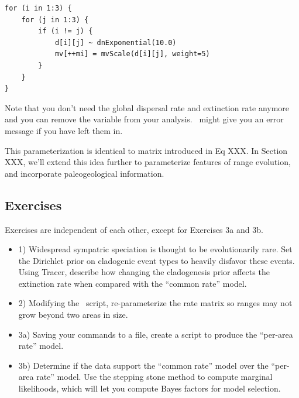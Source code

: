 \begin{snugshade}
\begin{lstlisting}
for (i in 1:3) {
    for (j in 1:3) {
        if (i != j) {
            d[i][j] ~ dnExponential(10.0)
            mv[++mi] = mvScale(d[i][j], weight=5)
        }
    }
}
\end{lstlisting}
\end{snugshade}
Note that you don't need the global dispersal rate  and extinction rate  anymore and you can remove the variable from your analysis. \RevBayes~might give you an error message if you have left them in.

This parameterization is identical to matrix introduced in Eq XXX.
In Section XXX, we'll extend this idea further to parameterize features of range evolution, and incorporate paleogeological information.

\subsection{Exercises}

Exercises are independent of each other, except for Exercises 3a and 3b.

\begin{itemize}
\item 1) Widespread sympatric speciation is thought to be evolutionarily rare. Set the Dirichlet prior on cladogenic event types to heavily disfavor these events. Using Tracer, describe how changing the cladogenesis prior affects the extinction rate when compared with the ``common rate'' model.
\item 2) Modifying the \RevBayes~script, re-parameterize the rate matrix so ranges may not grow beyond two areas in size.
\item 3a) Saving your commands to a file, create a script to produce the ``per-area rate'' model.
\item 3b) Determine if the data support the ``common rate'' model over the ``per-area rate'' model. Use the stepping stone method to compute marginal likelihoods, which will let you compute Bayes factors for model selection.
\end{itemize}

